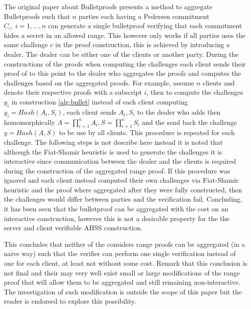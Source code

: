 




The original paper about Bulletproofs \cite{bulletProofs_theory} presents a method to aggregate Bulletproofs such that $n$ parties each having a Pedersen commitment $C_i,\: i=1,...,n$ can generate a single bulletproof verifying that each commitment hides a secret in an allowed range. This however only works if all parties uses the same challenge $c$ in the proof construction, this is achieved by introducing a dealer. The dealer can be either one of the clients or another party. During the constructions of the proofs when computing the challenges each client sends their proof of to this point to the dealer who aggregates the proofs and computes the challenges based on the aggregated proofs. For example, assume $n$ clients and denote their respective proofs with a subscript $i$, then to compute the challenges $y_i$ in construction \ref{alg:bullet} instead of each client computing $y_i = Hash(A_i,S_i)$, each client sends $A_i,S_i$ to the dealer who adds then homomorphically $A = \prod_{i=1}^n A_i, S = \prod_{i=1}^n S_i$ and the send back the challenge $y =Hash(A,S)$ to be use by all clients. This procedure is repeated for each challenge. The following steps is not describe here instead it is noted that although the Fiat-Shamir heuristic is used to generate the challenges it is interactive since communication between the dealer and the clients is required during the construction of the aggregated range proof. If this procedure was ignored and each client instead computed their own challenges via Fiat-Shamir heuristic and the proof where aggregated after they were fully constructed,  then the challenges would differ between parties and the verification fail. Concluding, it has been seen that the  bulletproof can be aggregated with the cost on an  interactive construction, however this is not a desirable property for the the server and client verifiable AHSS construction.

This concludes that neither of the considers range proofs can be aggregated  (in a naive way) such that the verifier can perform one single verification instead of one for each client, at least not without some cost. Remark that this conclusion is not final and their may very well exist small or large modifications of the range proof that will allow them to be aggregated and still remaining non-interactive. The investigation of such modification is outside the scope of this paper but the reader is endorsed to explore this possibility. 

